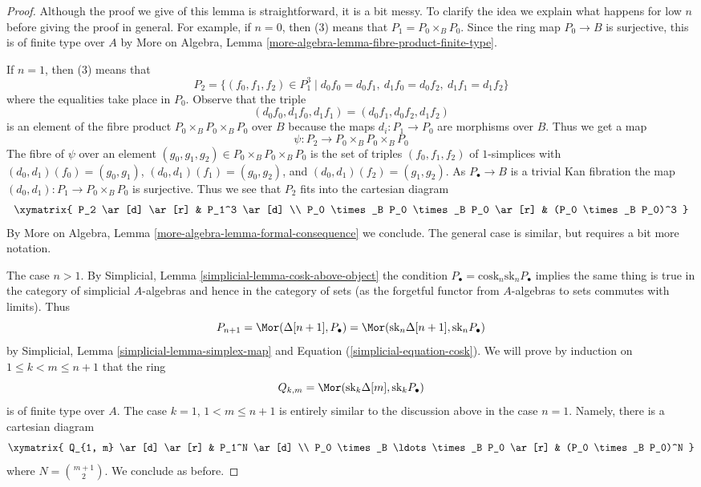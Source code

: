 \begin{proof}
Although the proof we give of this lemma is straightforward, it is a bit
messy. To clarify the idea we explain what happens for low $n$ before giving
the proof in general. For example, if $n = 0$, then (3) means that
$P_1 = P_0 \times_B P_0$. Since the ring map $P_0 \to B$ is surjective, this
is of finite type over $A$ by
More on Algebra, Lemma \ref{more-algebra-lemma-fibre-product-finite-type}.

\medskip\noindent
If $n = 1$, then (3) means that
$$
P_2 = \{(f_0, f_1, f_2) \in P_1^3 \mid
d_0f_0 = d_0f_1,\ d_1f_0 = d_0f_2,\ d_1f_1 = d_1f_2 \}
$$
where the equalities take place in $P_0$. Observe that the triple
$$
(d_0f_0, d_1f_0, d_1f_1) = (d_0f_1, d_0f_2, d_1f_2)
$$
is an element of the fibre product $P_0 \times_B P_0 \times_B P_0$ over $B$
because the maps $d_i : P_1 \to P_0$ are morphisms over $B$. Thus we get
a map
$$
\psi : P_2 \longrightarrow P_0 \times_B P_0 \times_B P_0
$$
The fibre of $\psi$ over an element
$(g_0, g_1, g_2) \in P_0 \times_B P_0 \times_B P_0$
is the set of triples $(f_0, f_1, f_2)$ of $1$-simplices
with $(d_0, d_1)(f_0) = (g_0, g_1)$, $(d_0, d_1)(f_1) = (g_0, g_2)$,
and $(d_0, d_1)(f_2) = (g_1, g_2)$. As $P_\bullet \to B$ is a trivial
Kan fibration the map $(d_0, d_1) : P_1 \to P_0 \times_B P_0$ is
surjective. Thus we see that $P_2$ fits into the cartesian diagram
$$
\xymatrix{
P_2 \ar[d] \ar[r] & P_1^3 \ar[d] \\
P_0 \times_B P_0 \times_B P_0 \ar[r] & (P_0 \times_B P_0)^3
}
$$
By More on Algebra, Lemma \ref{more-algebra-lemma-formal-consequence}
we conclude. The general case is similar, but requires a bit more notation.

\medskip\noindent
The case $n > 1$. By Simplicial, Lemma \ref{simplicial-lemma-cosk-above-object}
the condition $P_\bullet = \text{cosk}_n \text{sk}_n P_\bullet$
implies the same thing is true in the category of simplicial
$A$-algebras and hence in the category of sets (as the forgetful
functor from $A$-algebras to sets commutes with limits). Thus
$$
P_{n + 1} =
\Mor(\Delta[n + 1], P_\bullet) =
\Mor(\text{sk}_n \Delta[n + 1], \text{sk}_n P_\bullet)
$$
by Simplicial, Lemma \ref{simplicial-lemma-simplex-map} and
Equation (\ref{simplicial-equation-cosk}). We will prove by induction
on $1 \leq k < m \leq n + 1$ that the ring
$$
Q_{k, m} = \Mor(\text{sk}_k \Delta[m], \text{sk}_k P_\bullet)
$$
is of finite type over $A$. The case $k = 1$, $1 < m \leq n + 1$
is entirely similar to the discussion above in the case $n = 1$.
Namely, there is a cartesian diagram
$$
\xymatrix{
Q_{1, m} \ar[d] \ar[r] & P_1^N \ar[d] \\
P_0 \times_B \ldots \times_B P_0 \ar[r] & (P_0 \times_B P_0)^N
}
$$
where $N = {m + 1 \choose 2}$. We conclude as before.


\end{proof}
